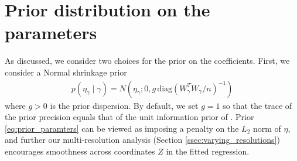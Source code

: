 \section{Prior distribution on the parameters}
\label{supplsec:prior_parameters}

 As discussed, we consider two choices for the prior on the coefficients. 
First, we consider a Normal shrinkage prior
\begin{align}
  p(\eta_\gamma \mid \gamma)= N\left( \eta_\gamma; 0, g\,  \mbox{diag}(W_\gamma^TW_\gamma/n)^{-1} \right)
\label{eq:prior_normalshinkage}
\end{align}
where $g>0$ is the prior dispersion. By default, we set $g=1$  so that the trace of the prior precision equals that of the unit information prior of \cite{schwarz:1978}. %
Prior \eqref{eq:prior_paramters} can be viewed as imposing a penalty on the $L_2$ norm of $\eta$,
and further our multi-resolution analysis (Section \ref{ssec:varying_resolutions}) encourages smoothness across coordinates $Z$ in the fitted regression.


